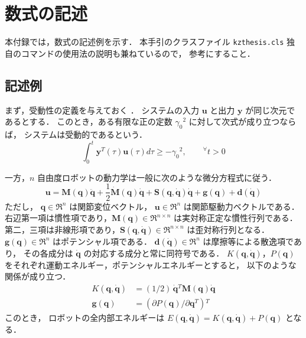 \chapter{数式の記述}

本付録では，数式の記述例を示す．
本手引のクラスファイル \texttt{kzthesis.cls} 独自のコマンドの使用法の説明も兼ねているので，
参考にすること．


\section{記述例}

まず，受動性の定義を与えておく \Cite{03}．
システムの入力 $\bm{u}$ と出力 $\bm{y}$ が同じ次元であるとする．
このとき，ある有限な正の定数 $\gamma_0{}^2$ に対して次式が成り立つならば，
システムは受動的であるという．
\begin{equation}
	\int_0^t \bm{y}^T(\tau) \bm{u}(\tau) d\tau \ge -\gamma_0{}^2, \qquad {}^\forall t>0				\label{eq:passivity}
\end{equation}

一方，$n$ 自由度ロボットの動力学は一般に次のような微分方程式に従う．
\begin{equation}
	\bm{u} = \bm{M}(\bm{q}) \ddot{\bm{q}}
		 + \frac{1}{2} \dot{\bm{M}}(\bm{q}) \dot{\bm{q}}
		 + \bm{S}(\bm{q},\dot{\bm{q}}) \dot{\bm{q}}
		 + \bm{g}(\bm{q})
		 + \bm{d}(\dot{\bm{q}})																		\label{eq:em}
\end{equation}
ただし，
$\bm{q} \in \Re^n$ は関節変位ベクトル，
$\bm{u} \in \Re^n$ は関節駆動力ベクトルである．
右辺第一項は慣性項であり，$\bm{M}(\bm{q}) \in \Re^{n \times n}$ は実対称正定な慣性行列である．
第二，三項は非線形項であり，$\bm{S}(\bm{q},\dot{\bm{q}}) \in \Re^{n \times n}$ は歪対称行列となる．
$\bm{g}(\bm{q}) \in \Re^n$ はポテンシャル項である．
$\bm{d}(\dot{\bm{q}}) \in \Re^n$ は摩擦等による散逸項であり，
その各成分は $\dot{\bm{q}}$ の対応する成分と常に同符号である．
$K(\bm{q},\dot{\bm{q}})$，$P(\bm{q})$ をそれぞれ運動エネルギー，ポテンシャルエネルギーとすると，
以下のような関係が成り立つ．
\begin{align}
	K(\bm{q},\dot{\bm{q}}) &= (1/2) \, \dot{\bm{q}}{}^T \bm{M}(\bm{q}) \dot{\bm{q}}					\\
	\bm{g}(\bm{q}) &= (\partial P(\bm{q})/\partial \bm{q}{}^T){}^T
\end{align}
このとき，
ロボットの全内部エネルギーは $E(\bm{q},\dot{\bm{q}}) = K(\bm{q},\dot{\bm{q}}) + P(\bm{q})$ となる．

